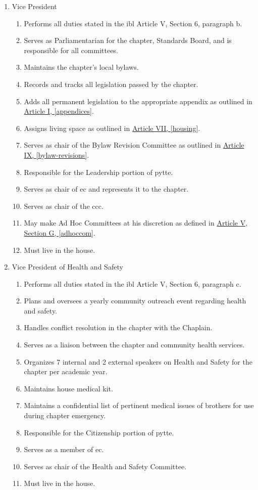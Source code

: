 \begin{enumerate}
		\item Vice President
			\begin{enumerate}
				\item Performs all duties stated in the \gls{ibl} Article V, Section 6, paragraph b.
				\item Serves as Parliamentarian for the chapter, Standards Board, and is responsible for all committees.
				\item Maintains the chapter's local bylaws. %
                \item Records and tracks all legislation passed by the chapter.
				\item Adds all permanent legislation to the appropriate appendix as outlined in \hyperref[appendices]{Article I, \autoref*{appendices}}.
				\item Assigns living space as outlined in \hyperref[housing]{Article VII, \autoref*{housing}}.
				\item Serves as chair of the Bylaw Revision Committee as outlined in \hyperref[bylaw-revisions]{Article IX, \autoref*{bylaw-revisions}}.
				\item Responsible for the Leadership portion of \gls{pytte}.
				\item Serves as chair of \gls{ec} and represents it to the chapter.
				\item Serves as chair of the \gls{ccc}.
				\item May make Ad Hoc Committees at his discretion as defined in \hyperref[adhoccom]{Article V, Section G, \autoref*{adhoccom}}.
				\item Must live in the house.
			\end{enumerate}

		\item Vice President of Health and Safety
			\begin{enumerate}
				\item Performs all duties stated in the \gls{ibl} Article V, Section 6, paragraph c.
				\item Plans and oversees a yearly community outreach event regarding health and safety.
				\item Handles conflict resolution in the chapter with the Chaplain.
				\item Serves as a liaison between the chapter and community health services.
				\item Organizes 7 internal and 2 external speakers on Health and Safety for the chapter per academic year.
				\item Maintains house medical kit.
				\item Maintains a confidential list of pertinent medical issues of brothers for use during chapter emergency.
				\item Responsible for the Citizenship portion of \gls{pytte}.
				\item Serves as a member of \gls{ec}.
				\item Serves as chair of the Health and Safety Committee.
				\item Must live in the house.
			\end{enumerate}


\end{enumerate}
